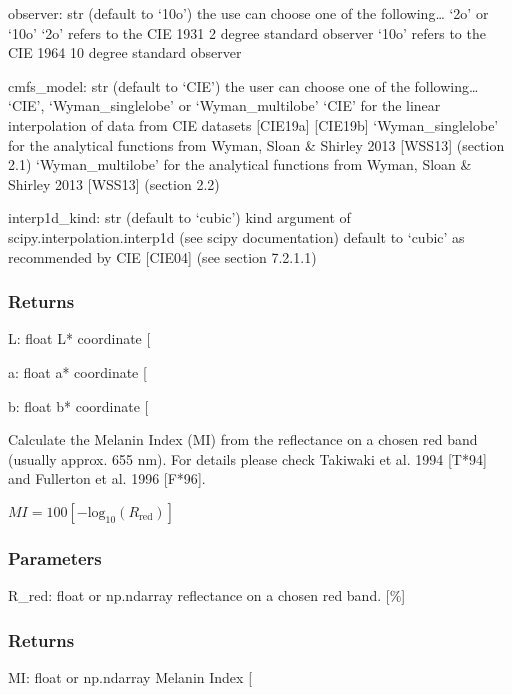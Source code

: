 \documentclass[letterpaper,10pt,english]{sphinxmanual}
\begin{document}
\begin{fulllineitems}
\sphinxAtStartPar
observer: str (default to ‘10o’)
the use can choose one of the following… ‘2o’ or ‘10o’
‘2o’ refers to the CIE 1931 2 degree standard observer
‘10o’ refers to the CIE 1964 10 degree standard observer

\sphinxAtStartPar
cmfs\_model: str (default to ‘CIE’)
the user can choose one of the following… ‘CIE’, ‘Wyman\_singlelobe’ or ‘Wyman\_multilobe’
‘CIE’ for the linear interpolation of data from CIE datasets {[}CIE19a{]} {[}CIE19b{]}
‘Wyman\_singlelobe’ for the analytical functions from Wyman, Sloan \& Shirley 2013 {[}WSS13{]} (section 2.1)
‘Wyman\_multilobe’ for the analytical functions from Wyman, Sloan \& Shirley 2013 {[}WSS13{]} (section 2.2)

\sphinxAtStartPar
interp1d\_kind: str (default to ‘cubic’)
kind argument of scipy.interpolation.interp1d (see scipy documentation)
default to ‘cubic’ as recommended by CIE {[}CIE04{]} (see section 7.2.1.1)


\subsubsection{Returns}
\label{\detokenize{07_colors:id14}}
\sphinxAtStartPar
L: float
L* coordinate {[}\sphinxhyphen{}{]}

\sphinxAtStartPar
a: float
a* coordinate {[}\sphinxhyphen{}{]}

\sphinxAtStartPar
b: float
b* coordinate {[}\sphinxhyphen{}{]}

\end{fulllineitems}


\begin{fulllineitems}
\label{\detokenize{07_colors:skinoptics.colors.MI}}
\pysigstartsignatures
{}
\pysigstopsignatures
\sphinxAtStartPar
Calculate the Melanin Index (MI) from the reflectance on a chosen red band
(usually approx. 655 nm).
For details please check Takiwaki et al. 1994 {[}T*94{]} and Fullerton et al. 1996 {[}F*96{]}.

\sphinxAtStartPar
\(MI = 100[-\mbox{log}_{10}(R_\mbox{red})]\)


\subsubsection{Parameters}
\label{\detokenize{07_colors:id15}}
\sphinxAtStartPar
R\_red: float or np.ndarray
reflectance on a chosen red band. {[}\%{]}


\subsubsection{Returns}
\label{\detokenize{07_colors:id16}}
\sphinxAtStartPar
MI: float or np.ndarray
Melanin Index {[}\sphinxhyphen{}{]}

\end{fulllineitems}
\end{document}
